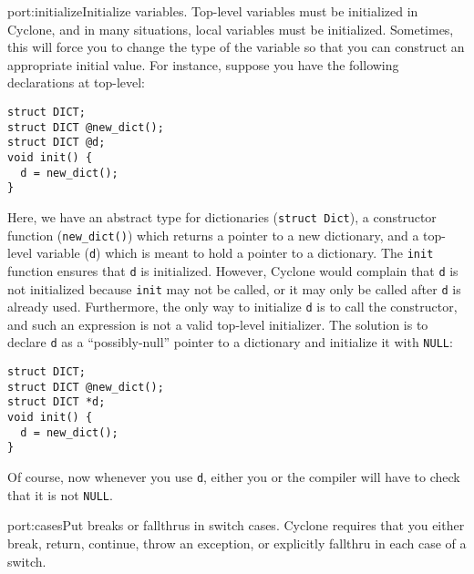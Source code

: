 \begin{porta}{port:initialize}{Initialize variables.}  
Top-level variables must be initialized
in Cyclone, and in many situations, local variables must be initialized.
Sometimes, this will force you to change the type of the variable
so that you can construct an appropriate initial value.  For instance,
suppose you have the following declarations at top-level:
\begin{verbatim}
struct DICT; 
struct DICT @new_dict();
struct DICT @d;
void init() {
  d = new_dict();
}
\end{verbatim}

Here, we have an abstract type for dictionaries 
(\texttt{struct Dict}), a constructor
function (\texttt{new\_dict()}) which returns a pointer to a new
dictionary, and a top-level variable (\texttt{d}) which is meant
to hold a pointer to a dictionary.  The \texttt{init} function
ensures that \texttt{d} is initialized.  However, 
Cyclone would complain that 
\texttt{d} is not initialized because \texttt{init} may not be
called, or it may only be called after \texttt{d} is already used.  
Furthermore, the only way to initialize \texttt{d}
is to call the constructor, and such an expression is not a 
valid top-level initializer.  The solution is to declare \texttt{d} as
a ``possibly-null'' pointer to a dictionary and initialize it
with \texttt{NULL}:
\begin{verbatim}
struct DICT; 
struct DICT @new_dict();
struct DICT *d;
void init() {
  d = new_dict();
}
\end{verbatim}

Of course, now whenever you use \texttt{d}, either you or the compiler
will have to check that it is not \texttt{NULL}.
\end{porta}

\begin{porta}{port:cases}{Put breaks or fallthrus in switch cases.}  
Cyclone requires
that you either break, return, continue, throw an exception, or explicitly
fallthru in each case of a switch.  
\end{porta}

